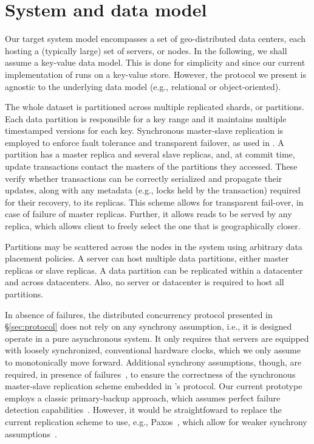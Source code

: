 \section{System  and data  model}
\label{sec:overview}

Our target system model encompasses a set of geo-distributed data centers, each hosting a (typically large) set of servers, or nodes. 
In the following, we shall assume a key-value data model. This is done for simplicity and since  our current implementation of \specula runs on a key-value store. However, the protocol we present  is agnostic to the underlying data model (e.g., relational or object-oriented). 

The whole dataset is partitioned across multiple replicated shards, or partitions.
Each data partition is responsible for a key range and it maintains multiple timestamped versions for each key.  Synchronous master-slave replication is employed to enforce fault tolerance and transparent failover, as used in \cite{spanner, baker2011megastore}. A partition has a master replica and several slave replicas, and, at commit time, update transactions contact the masters of the partitions they accessed. These verify whether transactions can be correctly serialized  and propagate their updates, along with any metadata (e.g., locks held by the transaction) required for their recovery, to its replicas.
This scheme allows for transparent fail-over, in case of failure of master replicas. Further, it allows reads to be served by any replica, which allows client to freely select the one that is geographically closer.


Partitions may be scattered across the nodes in the system using arbitrary data placement policies. A server can host multiple data partitions, either master replicas or slave replicas. A data partition can be replicated within a datacenter and across datacenters. Also, no server or datacenter is required to host all partitions. 

In absence of failures, the distributed concurrency protocol presented in \S \ref{sec:protocol} does not rely on any synchrony assumption, i.e., it is designed operate in a pure asynchronous system. It only requires that  servers are equipped with loosely synchronized, conventional hardware clocks, which we only assume to monotonically move forward. Additional synchrony assumptions, though, are required,  in presence of failures~\cite{FLP}, to ensure the correctness of the synchronous master-slave replication scheme embedded in \specula's protocol. Our current prototype employs a classic primary-backup approach, which assumes perfect failure detection capabilities~\cite{chandra-tueg-failure-detectors}. However, it would be straightfoward to replace the current replication scheme to use, e.g., Paxos~\cite{lamport2005generalized}, which  allow for weaker synchrony assumptions~\cite{partial-synchrony}.


